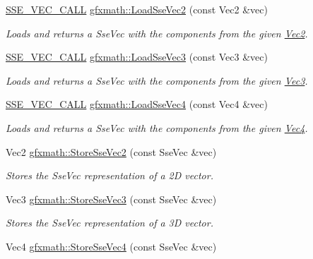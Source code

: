\begin{DoxyCompactItemize}
\hyperlink{ssevec__math__defs_8h_a97454f977a5281455cecacce1e8ba670}{S\+S\+E\+\_\+\+V\+E\+C\+\_\+\+C\+A\+L\+L} \hyperlink{group___s_i_m_d_vec_math_gaa2e01e9477a52d4e75199162069ab587}{gfxmath\+::\+Load\+Sse\+Vec2} (const Vec2 \&vec)
\begin{DoxyCompactList}\small\item\em Loads and returns a Sse\+Vec with the components from the given \hyperlink{classgfxmath_1_1_vec2}{Vec2}. \end{DoxyCompactList}\item 
\hyperlink{ssevec__math__defs_8h_a97454f977a5281455cecacce1e8ba670}{S\+S\+E\+\_\+\+V\+E\+C\+\_\+\+C\+A\+L\+L} \hyperlink{group___s_i_m_d_vec_math_ga7497f563df5d1254d1f62a880e6f6af8}{gfxmath\+::\+Load\+Sse\+Vec3} (const Vec3 \&vec)
\begin{DoxyCompactList}\small\item\em Loads and returns a Sse\+Vec with the components from the given \hyperlink{classgfxmath_1_1_vec3}{Vec3}. \end{DoxyCompactList}\item 
\hyperlink{ssevec__math__defs_8h_a97454f977a5281455cecacce1e8ba670}{S\+S\+E\+\_\+\+V\+E\+C\+\_\+\+C\+A\+L\+L} \hyperlink{group___s_i_m_d_vec_math_gad02605b7686cd42f188e6aa7ef1062b8}{gfxmath\+::\+Load\+Sse\+Vec4} (const Vec4 \&vec)
\begin{DoxyCompactList}\small\item\em Loads and returns a Sse\+Vec with the components from the given \hyperlink{classgfxmath_1_1_vec4}{Vec4}. \end{DoxyCompactList}\item 
Vec2 \hyperlink{group___s_i_m_d_vec_math_ga7aee046af0575fbd949e7d51c0bdeb7b}{gfxmath\+::\+Store\+Sse\+Vec2} (const Sse\+Vec \&vec)
\begin{DoxyCompactList}\small\item\em Stores the Sse\+Vec representation of a 2\+D vector. \end{DoxyCompactList}\item 
Vec3 \hyperlink{group___s_i_m_d_vec_math_gaf57f50238af36470ad18c1418e875d31}{gfxmath\+::\+Store\+Sse\+Vec3} (const Sse\+Vec \&vec)
\begin{DoxyCompactList}\small\item\em Stores the Sse\+Vec representation of a 3\+D vector. \end{DoxyCompactList}\item 
Vec4 \hyperlink{group___s_i_m_d_vec_math_ga7796c47cfb06233edc63cf9f331f437c}{gfxmath\+::\+Store\+Sse\+Vec4} (const Sse\+Vec \&vec)

\end{DoxyCompactItemize}
